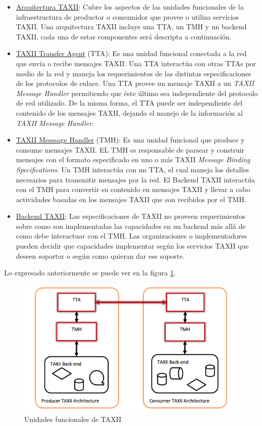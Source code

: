 \begin{itemize}
  \item \underline{Arquitectura TAXII}: Cubre los aspectos de las unidades funcionales de la 
  infraestructura de productor o consumidor que provee o utiliza servicios 
  TAXII. Una arquitectura TAXII incluye una TTA, un TMH y un backend TAXII, cada una de estas componentes será descripta a continuación.
  \item \underline{TAXII Transfer Agent} (TTA): Es una unidad funcional conectada a la red 
  que envía o recibe mensajes TAXII. Una TTA interactúa con otras TTAs por medio 
  de la red y maneja los requerimientos de las distintas especificaciones de 
  los protocolos de enlace. Una TTA provee un mensaje TAXII a un \textit{TAXII Message 
  Handler} permitiendo que éste último sea independiente del protocolo de red 
  utilizado. De la misma forma, el TTA puede ser independiente del contenido de 
  los mensajes TAXII, dejando el manejo de la información al \textit{TAXII Message 
  Handler}.
  \item \underline{TAXII Messsage Handler} (TMH): Es una unidad funcional que produce y 
  consume mensajes TAXII. EL TMH es responsable de parsear y construir mensajes 
  con el formato especificado en uno o más TAXII \textit{Message Binding Specifications}. 
  Un TMH interactúa con un TTA, el cual maneja los detalles necesarios para 
  transmitir mensajes por la red. El Backend TAXII interactúa con el TMH para 
  convertir su contenido en mensajes TAXII y llevar a cabo actividades basadas 
  en los mensajes TAXII que son recibidos por el TMH.
  \item \underline{Backend TAXII}: Las especificaciones de TAXII no proveen requerimientos sobre como son 
  implementadas las capacidades en un backend más allá de como debe interactuar 
  con el TMH. Las organizaciones o implementadores pueden decidir que 
  capacidades implementar según los servicios TAXII que deseen soportar o según 
  como quieran dar ese soporte.
  \end{itemize}

Lo expresado anteriormente se puede ver en la figura \ref{fig.unidades_funcionales}.

\begin{figure}[ht!]
  \centering
    \includegraphics[width=150mm]{./images/TAXIIArchitecture.png}
    \caption{Unidades funcionales de TAXII \protect\cite{b1}}
    \label{fig.unidades_funcionales}
\end{figure}

